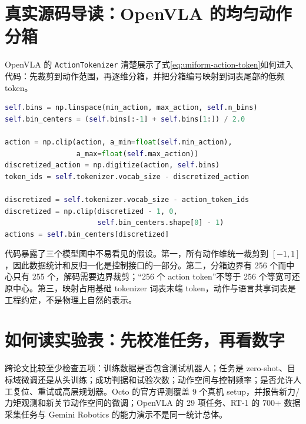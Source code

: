 \section{真实源码导读：OpenVLA 的均匀动作分箱}

OpenVLA 的 \texttt{ActionTokenizer} 清楚展示了式\eqref{eq:uniform-action-token}如何进入代码：先裁剪到动作范围，再逐维分箱，并把分箱编号映射到词表尾部的低频 token\cite{openvla2024code}。

\begin{lstlisting}[language=Python,caption={OpenVLA ActionTokenizer 的关键路径（MIT；为节省篇幅删去类型与批处理分支）}]
self.bins = np.linspace(min_action, max_action, self.n_bins)
self.bin_centers = (self.bins[:-1] + self.bins[1:]) / 2.0

action = np.clip(action, a_min=float(self.min_action),
                 a_max=float(self.max_action))
discretized_action = np.digitize(action, self.bins)
token_ids = self.tokenizer.vocab_size - discretized_action

discretized = self.tokenizer.vocab_size - action_token_ids
discretized = np.clip(discretized - 1, 0,
                      self.bin_centers.shape[0] - 1)
actions = self.bin_centers[discretized]
\end{lstlisting}

代码暴露了三个模型图中不易看见的假设。第一，所有动作维统一裁剪到 $[-1,1]$，因此数据统计和反归一化是控制接口的一部分。第二，分箱边界有 256 个而中心只有 255 个，解码需要边界裁剪；“256 个 action token”不等于 256 个等宽可还原中心。第三，映射占用基础 tokenizer 词表末端 token，动作与语言共享词表是工程约定，不是物理上自然的表示。

\section{如何读实验表：先校准任务，再看数字}

跨论文比较至少检查五项：训练数据是否包含测试机器人；任务是 zero-shot、目标域微调还是从头训练；成功判据和试验次数；动作空间与控制频率；是否允许人工复位、重试或高层规划器。Octo 的官方评测覆盖 9 个真机 setup，并报告新力/力矩观测和新关节动作空间的微调\cite{octo2024}；OpenVLA 的 29 项任务、RT-1 的 700+ 数据采集任务与 Gemini Robotics 的能力演示不是同一统计总体。

